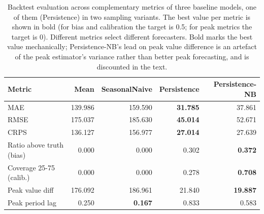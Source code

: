 \begin{table}[t]
  \centering
  \caption{Backtest evaluation across complementary metrics of three baseline models, one of them (Persistence) in two sampling variants. The best value per metric is shown in bold (for bias and calibration the target is 0.5; for peak metrics the target is 0). Different metrics select different forecasters. Bold marks the best value mechanically; Persistence-NB's lead on peak value difference is an artefact of the peak estimator's variance rather than better peak forecasting, and is discounted in the text.}
  \label{tab:results-metrics}
  \begin{tabular}{lrrrr}
    \toprule
    Metric & Mean & SeasonalNaive & Persistence & Persistence-NB \\
    \midrule
    MAE & 139.986 & 159.590 & \textbf{31.785} & 37.861 \\
    RMSE & 175.037 & 185.630 & \textbf{45.014} & 52.671 \\
    CRPS & 136.127 & 156.977 & \textbf{27.014} & 27.639 \\
    Ratio above truth (bias) & 0.000 & 0.000 & 0.302 & \textbf{0.372} \\
    Coverage 25-75 (calib.) & 0.000 & 0.000 & 0.278 & \textbf{0.708} \\
    Peak value diff & 176.092 & 186.961 & 21.840 & \textbf{19.887} \\
    Peak period lag & 0.250 & \textbf{0.167} & 0.833 & 0.583 \\
    \bottomrule
  \end{tabular}
\end{table}
